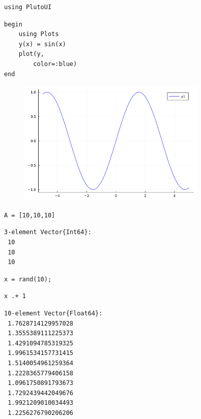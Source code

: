 \newpage

\begin{lstlisting}[language=JuliaLocal, style=julia]
using PlutoUI
\end{lstlisting}

\begin{lstlisting}[language=JuliaLocal, style=julia]
begin
	using Plots
	y(x) = sin(x)
	plot(y,
		color=:blue)
end
\end{lstlisting}

\begin{figure}[H]
	\centering
	\includegraphics[width=0.8\textwidth]{./figures/examplepluto_figure1.png}
	\label{fig:examplepluto_figure1.png}

\end{figure}

\begin{lstlisting}[language=JuliaLocal, style=julia]
A = [10,10,10]
\end{lstlisting}

\begin{verbatim}
3-element Vector{Int64}:
 10
 10
 10
\end{verbatim}

\begin{lstlisting}[language=JuliaLocal, style=julia]
x = rand(10);
\end{lstlisting}

\begin{lstlisting}[language=JuliaLocal, style=julia]
x .+ 1
\end{lstlisting}

\begin{verbatim}
10-element Vector{Float64}:
 1.7628714129957028
 1.3555389111225373
 1.4291094785319325
 1.9961534157731415
 1.5140054961259364
 1.2228365779406158
 1.0961750891793673
 1.7292439442049676
 1.9921209010034493
 1.2256276790206206
\end{verbatim}

